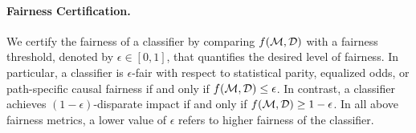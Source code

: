 \paragraph{Fairness Certification.} We certify the fairness of a classifier by comparing $ f(\mathcal{M}, \mathcal{D}) $ with a fairness threshold, denoted by $ \epsilon \in [0,1] $, that quantifies the desired level of fairness. In particular, a classifier is $ \epsilon $-fair with respect to statistical parity, equalized odds, or path-specific causal fairness if and only if $ f(\mathcal{M}, \mathcal{D}) \le \epsilon $. In contrast, a classifier achieves $(1 - \epsilon)$-disparate impact  if and only if $ f(\mathcal{M}, \mathcal{D}) \ge 1 - \epsilon $. In all above fairness metrics, a lower value of $ \epsilon $ refers to higher fairness of the classifier.






